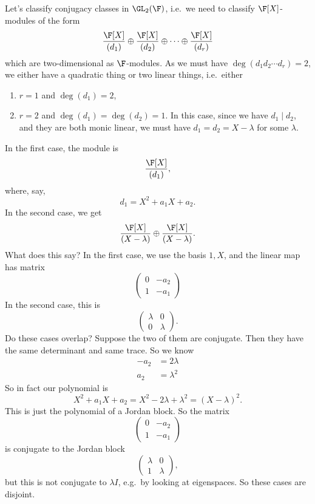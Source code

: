 \documentclass[a4paper]{article}
\begin{document}
\begin{eg}
  Let's classify conjugacy classes in $\GL_2(\F)$, i.e.\ we need to classify $\F[X]$-modules of the form
  \[
    \frac{\F[X]}{(d_1)} \oplus \frac{\F[X]}{(d_2)} \oplus \cdots \oplus \frac{\F[X]}{(d_r)}
  \]
  which are two-dimensional as $\F$-modules. As we must have $\deg(d_1d_2 \cdots d_r) = 2$, we either have a quadratic thing or two linear things, i.e.\ either
  \begin{enumerate}
    \item $r = 1$ and $\deg (d_1) = 2$,
    \item $r = 2$ and $\deg (d_1) = \deg(d_2) = 1$. In this case, since we have $d_1 \mid d_2$, and they are both monic linear, we must have $d_1 = d_2 = X - \lambda$ for some $\lambda$.
  \end{enumerate}
  In the first case, the module is
  \[
    \frac{\F[X]}{(d_1)},
  \]
  where, say,
  \[
    d_1 = X^2 + a_1 X + a_2.
  \]
  In the second case, we get
  \[
    \frac{\F[X]}{(X - \lambda)} \oplus \frac{\F[X]}{(X - \lambda)}.
  \]
  What does this say? In the first case, we use the basis $1, X$, and the linear map has matrix
  \[
    \begin{pmatrix}
      0 & -a_2\\
      1 & -a_1
    \end{pmatrix}
  \]
  In the second case, this is
  \[
    \begin{pmatrix}
      \lambda & 0\\
      0 & \lambda
    \end{pmatrix}.
  \]
  Do these cases overlap? Suppose the two of them are conjugate. Then they have the same determinant and same trace. So we know
  \begin{align*}
    -a_2 &= 2\lambda\\
    a_2 &= \lambda^2
  \end{align*}
  So in fact our polynomial is
  \[
    X^2 + a_1 X + a_2 = X^2 - 2\lambda + \lambda^2 = (X - \lambda)^2.
  \]
  This is just the polynomial of a Jordan block. So the matrix
  \[
    \begin{pmatrix}
      0 & -a_2\\
      1 & -a_1
    \end{pmatrix}
  \]
  is conjugate to the Jordan block
  \[
    \begin{pmatrix}
      \lambda & 0\\
      1 & \lambda
    \end{pmatrix},
  \]
  but this is not conjugate to $\lambda I$, e.g.\ by looking at eigenspaces. So these cases are disjoint.


\end{eg}
\end{document}
